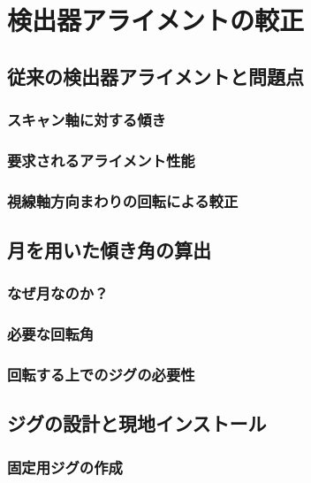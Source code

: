 \chapter{検出器アライメントの較正}
\label{chapter4}

\section{従来の検出器アライメントと問題点}

\subsection{スキャン軸に対する傾き}

\subsection{要求されるアライメント性能}

\subsection{視線軸方向まわりの回転による較正}

\section{月を用いた傾き角の算出}

\subsection{なぜ月なのか？}

\subsection{必要な回転角}

\subsection{回転する上でのジグの必要性}

\section{ジグの設計と現地インストール}

\subsection{固定用ジグの作成}

